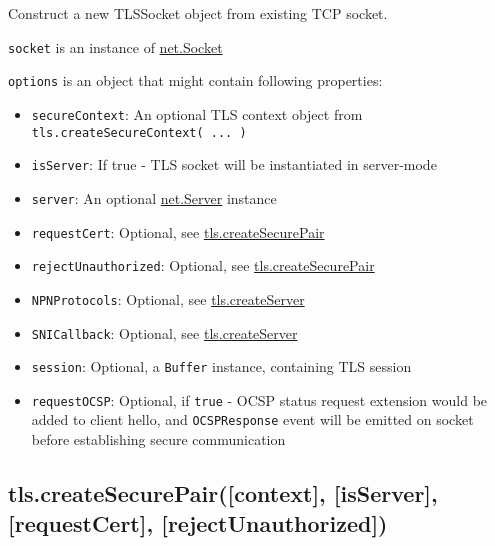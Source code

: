Construct a new TLSSocket object from existing TCP socket.

\texttt{socket} is an instance of
\href{net.html\#net_class_net_socket}{net.Socket}

\texttt{options} is an object that might contain following properties:

\begin{itemize}
\item
  \texttt{secureContext}: An optional TLS context object from
  \texttt{tls.createSecureContext( ... )}
\item
  \texttt{isServer}: If true - TLS socket will be instantiated in
  server-mode
\item
  \texttt{server}: An optional
  \href{net.html\#net_class_net_server}{net.Server} instance
\item
  \texttt{requestCert}: Optional, see
  \hyperref[tlsux5ftlsux5fcreatesecurepairux5fcredentialsux5fisserverux5frequestcertux5frejectunauthorized]{tls.createSecurePair}
\item
  \texttt{rejectUnauthorized}: Optional, see
  \hyperref[tlsux5ftlsux5fcreatesecurepairux5fcredentialsux5fisserverux5frequestcertux5frejectunauthorized]{tls.createSecurePair}
\item
  \texttt{NPNProtocols}: Optional, see
  \hyperref[tlsux5ftlsux5fcreateserverux5foptionsux5fsecureconnectionlistener]{tls.createServer}
\item
  \texttt{SNICallback}: Optional, see
  \hyperref[tlsux5ftlsux5fcreateserverux5foptionsux5fsecureconnectionlistener]{tls.createServer}
\item
  \texttt{session}: Optional, a \texttt{Buffer} instance, containing TLS
  session
\item
  \texttt{requestOCSP}: Optional, if \texttt{true} - OCSP status request
  extension would be added to client hello, and \texttt{OCSPResponse}
  event will be emitted on socket before establishing secure
  communication
\end{itemize}

\subsection{tls.createSecurePair({[}context{]}, {[}isServer{]},
{[}requestCert{]},
{[}rejectUnauthorized{]})}\label{tls.createsecurepaircontext-isserver-requestcert-rejectunauthorized}

\begin{Shaded}
\begin{Highlighting}[]
 \NormalTok{- }  
\end{Highlighting}
\end{Shaded}

